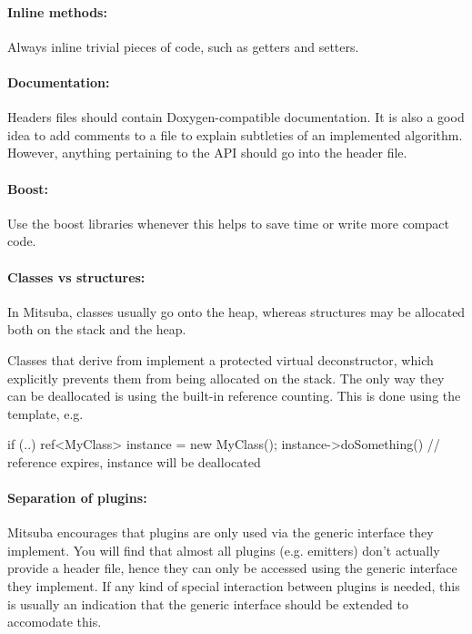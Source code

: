 \paragraph{Inline methods:} Always inline trivial pieces of code, such
as getters and setters.
\paragraph{Documentation:} Headers files should contain
Doxygen-compatible documentation. It is also a good idea to add
comments to a  file to explain subtleties of an implemented algorithm.
However, anything pertaining to the API should go into the header file.

\paragraph{Boost:} Use the boost libraries whenever this helps to save
time or write more compact code.

\paragraph{Classes vs structures:}In Mitsuba, classes usually go onto the heap,
whereas structures may be allocated both on the stack and the heap.

Classes that derive from  implement a protected virtual
deconstructor, which explicitly prevents them from being allocated on the stack.
The only way they can be deallocated is using the built-in reference
counting. This is done using the  template, e.g.

\begin{cpp}
if (..) {
    ref<MyClass> instance = new MyClass();
    instance->doSomething()
}   // reference expires, instance will be deallocated
\end{cpp}

\paragraph{Separation of plugins:}Mitsuba encourages that plugins are only
used via the generic interface they implement. You will find that almost all plugins
(e.g. emitters) don't actually provide a header file, hence they can only be accessed
using the generic  interface they implement. If any kind of special
interaction between plugins is needed, this is usually an indication that the
generic interface should be extended to accomodate this.
